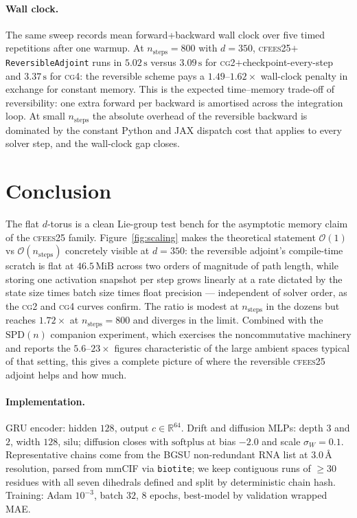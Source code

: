 \documentclass[11pt,a4paper]{article}
\newcommand{\cfees}{\textsc{cfees25}}
\newcommand{\cgtwo}{\textsc{cg2}}
\newcommand{\cgfour}{\textsc{cg4}}
\newcommand{\Reals}{\mathbb{R}}
\begin{document}
\paragraph{Wall clock.}
The same sweep records mean forward+backward wall clock over five
timed repetitions after one warmup. At $n_{\mathrm{steps}} = 800$
with $d=350$, \cfees{}$+$\texttt{ReversibleAdjoint} runs in
$5.02\,\mathrm{s}$ versus $3.09\,\mathrm{s}$ for
\cgtwo{}$+$checkpoint-every-step and $3.37\,\mathrm{s}$ for
\cgfour{}: the reversible scheme pays a $1.49$--$1.62\times$
wall-clock penalty in exchange for constant memory. This is the
expected time--memory trade-off of reversibility: one extra forward
per backward is amortised across the integration loop. At small
$n_{\mathrm{steps}}$ the absolute overhead of the reversible
backward is dominated by the constant Python and JAX dispatch cost
that applies to every solver step, and the wall-clock gap closes.

\section{Conclusion}

The flat $d$-torus is a clean Lie-group test bench for the
asymptotic memory claim of the \cfees{} family.
Figure~\ref{fig:scaling} makes the theoretical statement
$\mathcal{O}(1)$ vs $\mathcal{O}(n_{\mathrm{steps}})$ concretely
visible at $d = 350$: the reversible adjoint's compile-time
scratch is flat at $46.5\,\mathrm{MiB}$ across two orders of
magnitude of path length, while storing one activation snapshot
per step grows linearly at a rate dictated by the state size
times batch size times float precision --- independent of solver
order, as the \cgtwo{} and \cgfour{} curves confirm. The ratio is
modest at $n_{\mathrm{steps}}$ in the dozens but reaches
$1.72\times$ at $n_{\mathrm{steps}} = 800$ and diverges in the
limit. Combined with the $\mathrm{SPD}(n)$ companion experiment,
which exercises the noncommutative machinery and reports the
$5.6$--$23\times$ figures characteristic of the large ambient
spaces typical of that setting, this gives a complete picture of
where the reversible \cfees{} adjoint helps and how much.

\paragraph{Implementation.}
GRU encoder: hidden $128$, output $c \in \Reals^{64}$. Drift and
diffusion MLPs: depth $3$ and $2$, width $128$, $\mathrm{silu}$;
diffusion closes with $\mathrm{softplus}$ at bias $-2.0$ and scale
$\sigma_W = 0.1$. Representative chains come from the BGSU
non-redundant RNA list at $3.0\,$\AA{} resolution, parsed from
mmCIF via \texttt{biotite}; we keep contiguous runs of $\geq 30$
residues with all seven dihedrals defined and split by deterministic
chain hash. Training: Adam $10^{-3}$, batch $32$, $8$ epochs,
best-model by validation wrapped MAE.
\end{document}
